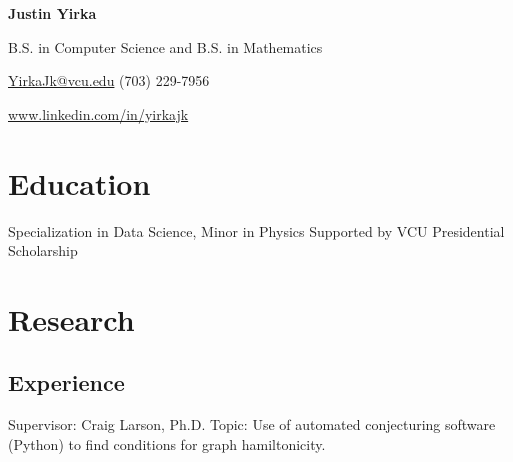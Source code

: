 \documentclass[11pt,letterpaper,serif]{moderncv}
\begin{document}

\thispagestyle{firstpage}

\begin{center}
	{\Large\textbf{Justin Yirka}}
	
	B.S. in Computer Science and B.S. in Mathematics
	
	\href{mailto:yirkajk@vcu.edu}{YirkaJk@vcu.edu} \hspace{2em} (703) 229-7956
	
	\url{www.linkedin.com/in/yirkajk}	
\end{center}


\setlength{\parskip}{0em}
\setlength\bibitemsep{\parskip}


\vspace{-2em}
\section{Education}
\vspace{-1.5em}
{	
	\begin{adjustwidth}{.25in}{}
		Specialization in Data Science, Minor in Physics \newline
		Supported by VCU Presidential Scholarship
	\end{adjustwidth}
}


\section{Research}
\subsection{Experience}
{	
	\begin{adjustwidth}{.25in}{}
		Supervisor: Craig Larson, Ph.D. \newline
		Topic: Use of automated conjecturing software (Python) to find conditions for graph hamiltonicity.
	\end{adjustwidth}
}
\end{document}
